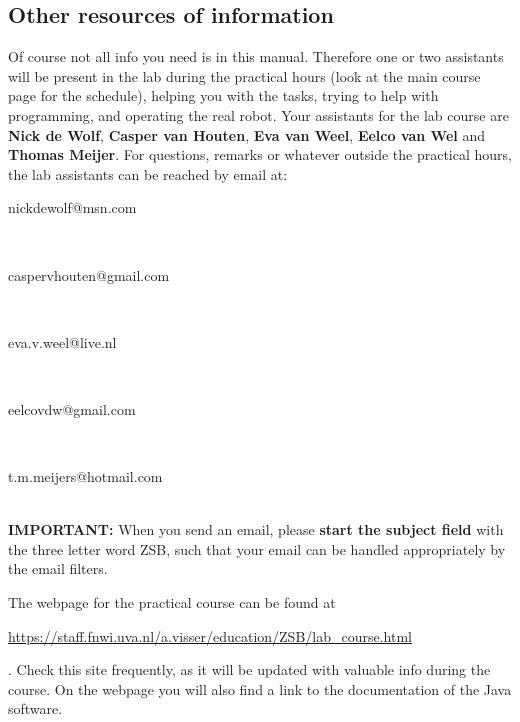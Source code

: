 \documentclass[10pt]{scrartcl}
\begin{document}
\subsection{Other resources of information}
Of course not all info you need is in this manual. Therefore one or two 
assistants will be present in the lab during the practical hours (look at
the main course page for the schedule), helping you with the tasks,
trying to help with programming, and operating the real robot. 
Your assistants for the lab course are {\bfseries Nick de Wolf}, {\bfseries Casper van Houten}, {\bfseries Eva van Weel}, {\bfseries Eelco van Wel} and {\bfseries Thomas Meijer}.
For questions, remarks or whatever outside the practical hours, the lab assistants can
be reached by email at:
\\\centerline{{\ttfamily nickdewolf@msn.com}}
\\\centerline{{\ttfamily caspervhouten@gmail.com}}
\\\centerline{{\ttfamily eva.v.weel@live.nl}}
\\\centerline{{\ttfamily eelcovdw@gmail.com}}
\\\centerline{{\ttfamily t.m.meijers@hotmail.com}}
\\


{\bf IMPORTANT:} When you send an email, please {\bfseries start the subject field} with the
three letter word
{\ttfamily ZSB}, such that your email can be handled appropriately by the 
email filters.

The webpage for the practical course can be found at \\
\centerline{\url{https://staff.fnwi.uva.nl/a.visser/education/ZSB/lab_course.html}}.
Check this site frequently, as it will be
updated with valuable info during the course. On the webpage you will also
find a link to the documentation of the Java software.

%
\end{document}
